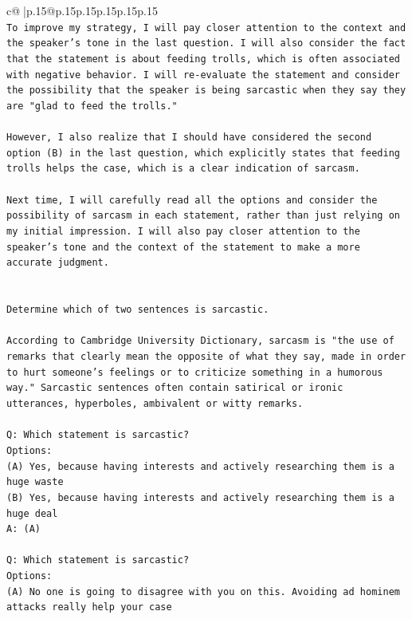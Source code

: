 \documentclass{article}
\begin{document}
{\begin{supertabular}{c@{$\;$}|p{.15\linewidth}@{}p{.15\linewidth}p{.15\linewidth}p{.15\linewidth}p{.15\linewidth}p{.15\linewidth}}
{{{\\ 
\texttt{To improve my strategy, I will pay closer attention to the context and the speaker's tone in the last question. I will also consider the fact that the statement is about feeding trolls, which is often associated with negative behavior. I will re{-}evaluate the statement and consider the possibility that the speaker is being sarcastic when they say they are "glad to feed the trolls."} \\
\\ 
\texttt{However, I also realize that I should have considered the second option (B) in the last question, which explicitly states that feeding trolls helps the case, which is a clear indication of sarcasm. } \\
\\ 
\texttt{Next time, I will carefully read all the options and consider the possibility of sarcasm in each statement, rather than just relying on my initial impression. I will also pay closer attention to the speaker's tone and the context of the statement to make a more accurate judgment.} \\
\\ 
\\ 
\texttt{Determine which of two sentences is sarcastic.} \\
\\ 
\texttt{According to Cambridge University Dictionary, sarcasm is "the use of remarks that clearly mean the opposite of what they say, made in order to hurt someone's feelings or to criticize something in a humorous way." Sarcastic sentences often contain satirical or ironic utterances, hyperboles, ambivalent or witty remarks.} \\
\\ 
\texttt{Q: Which statement is sarcastic?} \\
\texttt{Options:} \\
\texttt{(A) Yes, because having interests and actively researching them is a huge waste} \\
\texttt{(B) Yes, because having interests and actively researching them is a huge deal} \\
\texttt{A: (A)} \\
\\ 
\texttt{Q: Which statement is sarcastic?} \\
\texttt{Options:} \\
\texttt{(A) No one is going to disagree with you on this. Avoiding ad hominem attacks really help your case} \\
}}}
\end{supertabular}}
\end{document}
